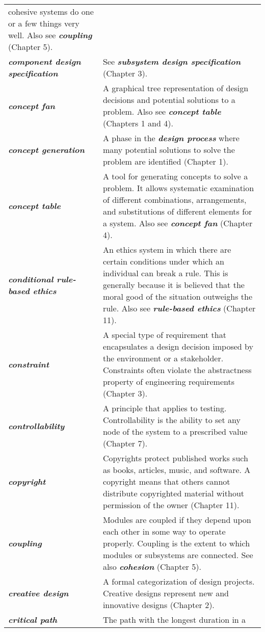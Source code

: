 \begin{longtable}[]{@{}
  >{\raggedright\arraybackslash}p{}
  >{\raggedright\arraybackslash}p{}@{}}
cohesive systems do one or a few things very well. Also see
\emph{\textbf{coupling}} (Chapter 5). \\
\emph{\textbf{component design specification}} & See
\emph{\textbf{subsystem design specification}} (Chapter 3). \\
\emph{\textbf{concept fan}} & A graphical tree representation of design
decisions and potential solutions to a problem. Also see
\emph{\textbf{concept table}} (Chapters 1 and 4). \\
\emph{\textbf{concept generation}} & A phase in the \emph{\textbf{design
process}} where many potential solutions to solve the problem are
identified (Chapter 1). \\
\emph{\textbf{concept table}} & A tool for generating concepts to solve
a problem. It allows systematic examination of different combinations,
arrangements, and substitutions of different elements for a system. Also
see \emph{\textbf{concept fan}} (Chapter 4). \\
\emph{\textbf{conditional rule-based ethics}} & An ethics system in
which there are certain conditions under which an individual can break a
rule. This is generally because it is believed that the moral good of
the situation outweighs the rule. Also see \emph{\textbf{rule-based
ethics}} (Chapter 11). \\
\emph{\textbf{constraint}} & A special type of requirement that
encapsulates a design decision imposed by the environment or a
stakeholder. Constraints often violate the abstractness property of
engineering requirements (Chapter 3). \\
\emph{\textbf{controllability}} & A principle that applies to testing.
Controllability is the ability to set any node of the system to a
prescribed value (Chapter 7). \\
\emph{\textbf{copyright}} & Copyrights protect published works such as
books, articles, music, and software. A copyright means that others
cannot distribute copyrighted material without permission of the owner
(Chapter 11). \\
\emph{\textbf{coupling}} & Modules are coupled if they depend upon each
other in some way to operate properly. Coupling is the extent to which
modules or subsystems are connected. See also \emph{\textbf{cohesion}}
(Chapter 5). \\
\emph{\textbf{creative design}} & A formal categorization of design
projects. Creative designs represent new and innovative designs (Chapter
2). \\
\emph{\textbf{critical path}} & The path with the longest duration in a

\end{longtable}
